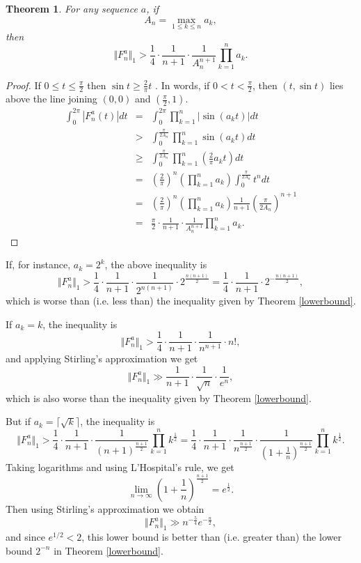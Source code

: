 \documentclass{amsart}
\newcommand{\norm}[1]{\Vert #1 \Vert}
\newtheorem{theorem}{Theorem}
\begin{document}
\begin{theorem}
For any sequence $a$,
if
\[
A_n=\max_{1 \leq k \leq n} a_k,
\]
then
\[
\norm{F_n^a}_1 > \frac{1}{4} \cdot \frac{1}{n+1} \cdot \frac{1}{A_n^{n+1}} \prod_{k=1}^n a_k.
\]
\label{triangle}
\end{theorem}
\begin{proof}
If $0 \leq t \leq \frac{\pi}{2}$ then $\sin t \geq \frac{2}{\pi}t$ \cite{yuefeng}. In words, if $0 < t < \frac{\pi}{2}$, then $(t,\sin t)$ lies above
the line joining $(0,0)$ and $(\frac{\pi}{2},1)$. 
\begin{eqnarray*}
\int_0^{2\pi} |F_n^a(t)| dt&=&\int_0^{2\pi} \prod_{k=1}^n |\sin(a_k t)| dt\\
&>&\int_0^{\frac{\pi}{2A_n}} \prod_{k=1}^n \sin(a_k t) dt\\
&\geq&\int_0^{\frac{\pi}{2A_n}} \prod_{k=1}^n\left( \frac{2}{\pi} a_k t \right) dt\\
&=&\left( \frac{2}{\pi} \right)^n \left( \prod_{k=1}^n a_k \right)\int_0^{\frac{\pi}{2A_n}} t^n dt\\
&=&\left( \frac{2}{\pi} \right)^n \left( \prod_{k=1}^n a_k \right) \frac{1}{n+1} \left( \frac{\pi}{2A_n} \right)^{n+1}\\
&=&\frac{\pi}{2} \cdot \frac{1}{n+1} \cdot \frac{1}{A_n^{n+1}} \prod_{k=1}^n a_k.
\end{eqnarray*}
\end{proof}

If, for instance, $a_k=2^k$, the above inequality is
\[
\norm{F_n^a}_1 > \frac{1}{4} \cdot \frac{1}{n+1} \cdot \frac{1}{2^{n(n+1)}} \cdot 2^{\frac{n(n+1)}{2}} =
\frac{1}{4} \cdot \frac{1}{n+1} \cdot 2^{-\frac{n(n+1)}{2}},
\]
which is worse than (i.e. less than) the inequality given by Theorem \ref{lowerbound}. 

If $a_k=k$, the inequality is
\[
\norm{F_n^a}_1> \frac{1}{4} \cdot \frac{1}{n+1} \cdot \frac{1}{n^{n+1}} \cdot n!,
\]
and applying Stirling's approximation we get
\[
\norm{F_n^a}_1 \gg \frac{1}{n+1} \cdot \frac{1}{\sqrt{n}} \cdot \frac{1}{e^n},
\]
which is also worse than the inequality given by Theorem \ref{lowerbound}. 

But if $a_k=\lceil \sqrt{k} \rceil$, the inequality is
\[
\norm{F_n^a}_1 >  \frac{1}{4} \cdot \frac{1}{n+1} \cdot \frac{1}{(n+1)^{\frac{n+1}{2}}} \prod_{k=1}^n k^{\frac{1}{2}}=
 \frac{1}{4} \cdot \frac{1}{n+1} \cdot \frac{1}{n^{\frac{n+1}{2}}} \cdot \frac{1}{\left(1+\frac{1}{n} \right)^{\frac{n+1}{2}}} \prod_{k=1}^n k^{\frac{1}{2}}.
\]
Taking logarithms and using L'Hospital's rule, we get
\[
\lim_{n \to \infty} \left(1+\frac{1}{n} \right)^{\frac{n+1}{2}}=e^{\frac{1}{2}}.
\]
Then using Stirling's approximation we obtain
\[
\norm{F_n^a}_1 \gg n^{-\frac{5}{4}} e^{-\frac{n}{2}},
\]
and since $e^{1/2}<2$, this lower bound is better than (i.e. greater than) the lower bound $2^{-n}$ in Theorem \ref{lowerbound}. 
\end{document}

